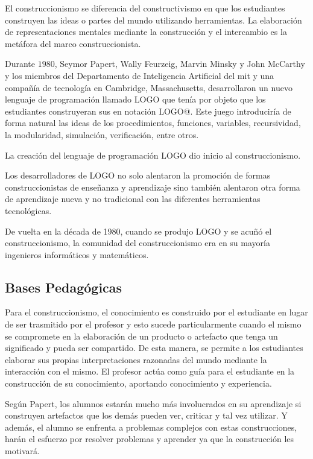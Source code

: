 El construccionismo se diferencia del constructivismo en que los estudiantes
construyen las ideas o partes del mundo utilizando herramientas. La elaboración
de representaciones mentales mediante la construcción y el intercambio es la
metáfora del marco construccionista\cite{historia:2014}. 

Durante $1980$, Seymor Papert, Wally Feurzeig, Marvin Minsky y John McCarthy y los
miembros del Departamento de Inteligencia Artificial del \Gls{mit} y una
compañía de tecnología en Cambridge, Massachusetts, desarrollaron un nuevo
lenguaje de programación llamado LOGO que tenía por objeto que los estudiantes
construyeran sus  en notación LOGO@. Este juego
introduciría de forma natural las ideas de los procedimientos, funciones,
variables, recursividad, la modularidad, simulación, verificación, entre otros\cite{historia:2014}.

La creación del lenguaje de programación LOGO dio inicio al construccionismo\cite{historia:2014}.

Los desarrolladores de LOGO no solo alentaron la promoción de formas
construccionistas de enseñanza y aprendizaje sino también alentaron otra forma
de aprendizaje nueva y no tradicional con las diferentes herramientas tecnológicas\cite{historia:2014}. 

De vuelta en la década de 1980, cuando se produjo LOGO y se acuñó el
construccionismo, la comunidad del construccionismo era en su mayoría  ingenieros
informáticos y matemáticos\cite{historia:2014}.


\subsection{Bases Pedagógicas}

Para el construccionismo, el conocimiento es construido por el estudiante en
lugar de ser trasmitido por el profesor \cite{moses:2003} y esto sucede particularmente cuando
el mismo se compromete en la elaboración de un producto o artefacto que tenga un
significado y pueda ser compartido\cite{valdivia:sg}. De esta manera, se permite
a los estudiantes elaborar sus propias interpretaciones razonadas del mundo
mediante la interacción con el mismo. El profesor actúa como guía para el estudiante 
en la construcción de su conocimiento, aportando conocimiento y experiencia.

Según Papert, los alumnos estarán mucho más involucrados en su aprendizaje si
construyen artefactos que los demás pueden ver, criticar y tal vez utilizar. Y
además, el alumno se enfrenta a problemas complejos con estas construcciones,
harán el esfuerzo por resolver problemas y aprender ya que la construcción les
motivará\cite{const:vs}.

